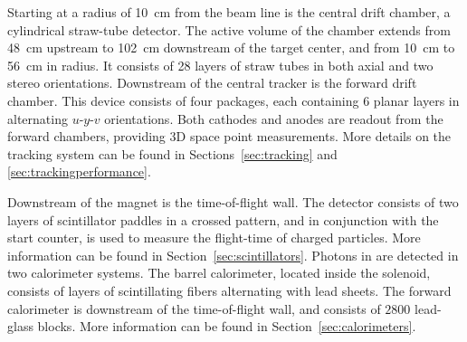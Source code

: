 


Starting at a radius of 10~cm from the beam line is the central drift chamber, a cylindrical straw-tube detector. The active volume of the chamber extends from 48~cm upstream to 102~cm downstream of the target center, and from 10~cm to 56~cm in radius. It consists of 28 layers of straw tubes in both axial and two stereo orientations. Downstream of the central tracker is the forward drift chamber. This device consists of four packages, each containing 6 planar layers in alternating $u$-$y$-$v$ orientations. Both cathodes and anodes are readout from the forward chambers, providing 3D space point measurements. More details on the tracking system can be found in Sections~\ref{sec:tracking} and \ref{sec:trackingperformance}. 

Downstream of the magnet is the time-of-flight wall. The detector consists of two layers of scintillator paddles in a crossed pattern, and in conjunction with the start counter, is used to measure the flight-time of charged particles. More information can be found in Section~\ref{sec:scintillators}. 
Photons in \gx{} are detected in two calorimeter systems. The barrel calorimeter, located inside the solenoid, consists of layers of scintillating fibers alternating with lead sheets. The forward calorimeter is downstream of the time-of-flight wall, and consists of $2800$ lead-glass blocks. More information can be found in Section~\ref{sec:calorimeters}.

